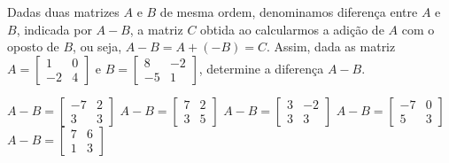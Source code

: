 Dadas duas matrizes $A$ e $B$ de mesma ordem, denominamos diferença entre $A$ e $B$, indicada por $A-B$, a matriz $C$ obtida ao calcularmos a adição de $A$ com o oposto de $B$, ou seja, $A-B=A+(-B)=C$. Assim, dada as matriz $A = \left[ \begin{array}{cc}
1 & 0 \\
-2 & 4
\end{array} \right]$ e $B = \left[ \begin{array}{cc}
8 & -2 \\
-5 & 1
\end{array} \right]$, determine a diferença $A-B$.

$A-B=\left[ \begin{array}{cc}	-7 & 2 \\	3 & 3 \end{array} \right]$
$A-B=\left[ \begin{array}{cc}	7 & 2 \\	3 & 5 \end{array} \right]$
$A-B=\left[ \begin{array}{cc}	3 & -2 \\	3 & 3 \end{array} \right]$
$A-B=\left[ \begin{array}{cc}	-7 & 0 \\	5 & 3 \end{array} \right]$
$A-B=\left[ \begin{array}{cc}	7 & 6 \\	1 & 3 \end{array} \right]$


